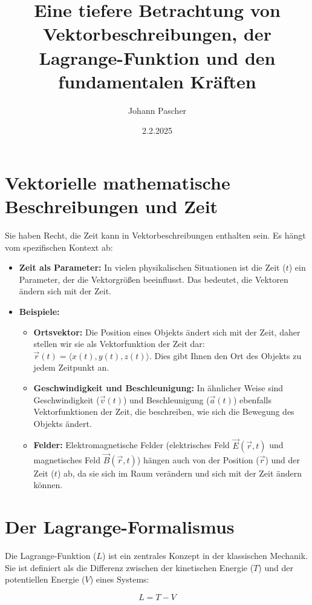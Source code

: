 \documentclass{article}
\title{Eine tiefere Betrachtung von Vektorbeschreibungen, der Lagrange-Funktion und den fundamentalen Kräften}
\author{Johann Pascher}
\date{2.2.2025}
\begin{document}
	
	\maketitle
	
	\section{Vektorielle mathematische Beschreibungen und Zeit}
	
	Sie haben Recht, die Zeit kann in Vektorbeschreibungen enthalten sein. Es hängt vom spezifischen Kontext ab:
	
	\begin{itemize}
		\item \textbf{Zeit als Parameter:} In vielen physikalischen Situationen ist die Zeit ($t$) ein Parameter, der die Vektorgrößen beeinflusst. Das bedeutet, die Vektoren ändern sich mit der Zeit.
		\item \textbf{Beispiele:}
		\begin{itemize}
			\item \textbf{Ortsvektor:} Die Position eines Objekts ändert sich mit der Zeit, daher stellen wir sie als Vektorfunktion der Zeit dar: $\vec{r}(t) = \langle x(t), y(t), z(t) \rangle$. Dies gibt Ihnen den Ort des Objekts zu jedem Zeitpunkt an.
			\item \textbf{Geschwindigkeit und Beschleunigung:} In ähnlicher Weise sind Geschwindigkeit ($\vec{v}(t)$) und Beschleunigung ($\vec{a}(t)$) ebenfalls Vektorfunktionen der Zeit, die beschreiben, wie sich die Bewegung des Objekts ändert.
			\item \textbf{Felder:} Elektromagnetische Felder (elektrisches Feld $\vec{E}(\vec{r},t)$ und magnetisches Feld $\vec{B}(\vec{r},t)$) hängen auch von der Position ($\vec{r}$) und der Zeit ($t$) ab, da sie sich im Raum verändern und sich mit der Zeit ändern können.
		\end{itemize}
	\end{itemize}
	
	\section{Der Lagrange-Formalismus}
	
	Die Lagrange-Funktion ($L$) ist ein zentrales Konzept in der klassischen Mechanik. Sie ist definiert als die Differenz zwischen der kinetischen Energie ($T$) und der potentiellen Energie ($V$) eines Systems:
	
	$$L = T - V$$
	
\end{document}
